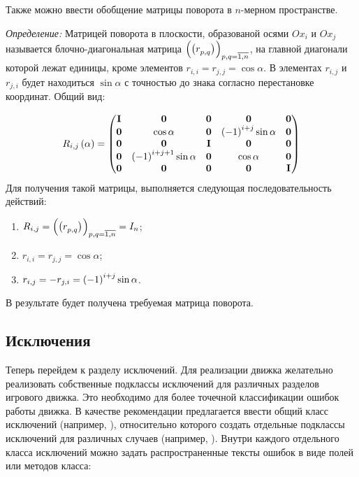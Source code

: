 	Также можно ввести обобщение матрицы поворота в $n$-мерном пространстве. 

	\textit{Определение:} Матрицей поворота в плоскости, образованой осями $Ox_i$ и $Ox_j$ называется блочно-диагональная матрица \( \left( \left( r_{p, q}^{} \right)^{\vphantom{1}} \right)_{p, q = \overline{1, n}} \), на главной диагонали которой лежат единицы, кроме элементов \( r_{i, i} = r_{j, j} = \cos{\alpha} \). В элементах \( r_{i, j} \) и \( r_{j, i} \) будет находиться $\sin{\alpha}$ с точностью до знака согласно перестановке координат. Общий вид:

	\[ R_{i, j}\left( \alpha \right) = \begin{pmatrix} 
		\mathbf{I} & \mathbf{0} & \mathbf{0} & \mathbf{0} & \mathbf{0} \\
		\mathbf{0} & \cos{\alpha} & \mathbf{0} & \left( -1 \right)^{i + j} \sin{\alpha} & \mathbf{0} \\
		\mathbf{0} & \mathbf{0} & \mathbf{I} & \mathbf{0} & \mathbf{0} \\
		\mathbf{0} & \left( -1 \right)^{i + j + 1} \sin{\alpha} & \mathbf{0} & \cos{\alpha} & \mathbf{0} \\
		\mathbf{0} & \mathbf{0} & \mathbf{0} & \mathbf{0} & \mathbf{I}
	\end{pmatrix} \]
	Для получения такой матрицы, выполняется следующая последовательность действий:
	\begin{enumerate}
		\item \( R_{i, j} = \left( \left( r_{p, q}^{} \right)^{\vphantom{1}} \right)_{p, q = \overline{1, n}} = I_{n} \);
		\item \( r_{i, i} = r_{j, j} = \cos{\alpha} \);
		\item \( r_{i, j} = - r_{j, i} = \left( -1 \right)^{i + j} \sin{\alpha} \).
	\end{enumerate}
	В результате будет получена требуемая матрица поворота.


\subsection{Исключения}

	Теперь перейдем к разделу исключений. Для реализации движка желательно реализовать собственные подклассы исключений для различных разделов игрового движка. Это необходимо для более точечной классификации ошибок работы движка. В качестве рекомендации предлагается ввести общий класс исключений (например, ), относительно которого создать отдельные подклассы исключений для различных случаев (например, ). Внутри каждого отдельного класса исключений можно задать распространенные тексты ошибок в виде полей или методов класса:

